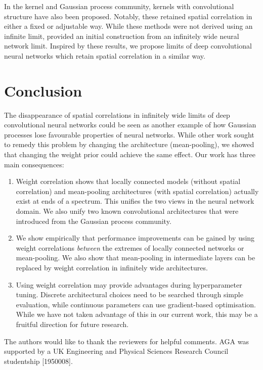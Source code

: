 \documentclass[accepted]{uai2021} %
\newcommand{\0}{\boldsymbol{0}}
\newcommand{\1}{\boldsymbol{1}}
\begin{document}
In the kernel and Gaussian process community, kernels with convolutional structure have also been proposed. Notably, these retained spatial correlation in either a fixed \citep{vdw2017convgp} or adjustable \citep{mairal2014ckn,dutordoir2020} way. While these methods were not derived using an infinite limit,  provided an initial construction from an infinitely wide neural network limit. Inspired by these results, we propose limits of deep convolutional neural networks which retain spatial correlation in a similar way.

\section{Conclusion}
The disappearance of spatial correlations in infinitely wide limits of deep convolutional neural networks could be seen as another example of how Gaussian processes lose favourable properties of neural networks. While other work sought to remedy this problem by changing the architecture (mean-pooling), we showed that changing the weight prior could achieve the same effect. Our work has three main consequences:
\begin{enumerate}
    \item Weight correlation shows that locally connected models (without spatial correlation) and mean-pooling architectures (with spatial correlation) actually exist at ends of a spectrum. This unifies the two views in the neural network domain. We also unify two known convolutional architectures that were introduced from the Gaussian process community.
    \item We show empirically that performance improvements can be gained by using weight correlations \emph{between} the extremes of locally connected networks or mean-pooling. We also show that mean-pooling in intermediate layers can be replaced by weight correlation in infinitely wide architectures.
    \item Using weight correlation may provide advantages during hyperparameter tuning. Discrete architectural choices need to be searched through simple evaluation, while continuous parameters can use gradient-based optimisation. While we have not taken advantage of this in our current work, this may be a fruitful direction for future research.
\end{enumerate}


\begin{acknowledgements}
The authors would like to thank the reviewers for helpful comments.
AGA was supported by a UK Engineering and Physical Sciences Research Council studentship [1950008].
\end{acknowledgements}


\end{document}
